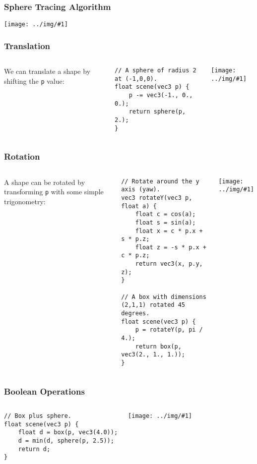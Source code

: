 \documentclass{beamer}
\newcommand\graphic[1]{\texttt{[image: ../img/\#1]}}
\begin{document}
\begin{frame}
    \frametitle{Sphere Tracing Algorithm}
    \graphic{ray-marching-overview.png}
\end{frame}

\begin{frame}[fragile]
    \frametitle{Translation}
    \begin{columns}
        We can translate a shape by shifting the \texttt{p} value:

        \begin{verbatim}
// A sphere of radius 2 at (-1,0,0).
float scene(vec3 p) {
    p -= vec3(-1., 0., 0.);
    return sphere(p, 2.);
}
        \end{verbatim}
        \graphic{translated-sphere.png}
    \end{columns}
\end{frame}

\begin{frame}[fragile]
    \frametitle{Rotation}
    \begin{columns}
        A shape can be rotated by transforming \texttt{p} with some simple
        trigonometry:


        \begin{verbatim}
// Rotate around the y axis (yaw).
vec3 rotateY(vec3 p, float a) {
    float c = cos(a);
    float s = sin(a);
    float x = c * p.x + s * p.z;
    float z = -s * p.x + c * p.z;
    return vec3(x, p.y, z);
}

// A box with dimensions (2,1,1) rotated 45 degrees.
float scene(vec3 p) {
    p = rotateY(p, pi / 4.);
    return box(p, vec3(2., 1., 1.));
}
        \end{verbatim}
        \graphic{rotated-box.png}
    \end{columns}
\end{frame}

\begin{frame}[fragile]
    \frametitle{Boolean Operations}
    \begin{columns}
        \begin{verbatim}
// Box plus sphere.
float scene(vec3 p) {
    float d = box(p, vec3(4.0));
    d = min(d, sphere(p, 2.5));
    return d;
}
        \end{verbatim}
        \graphic{box-plus-sphere.png}
    \end{columns}
\end{frame}
\end{document}
